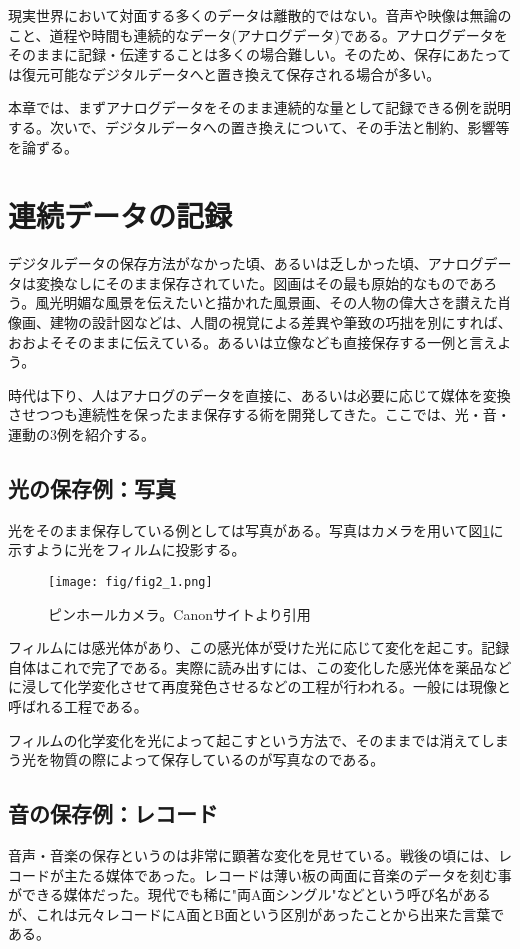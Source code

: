 現実世界において対面する多くのデータは離散的ではない。音声や映像は無論のこと、道程や時間も連続的なデータ(アナログデータ)である。アナログデータをそのままに記録・伝達することは多くの場合難しい。そのため、保存にあたっては復元可能なデジタルデータへと置き換えて保存される場合が多い。

本章では、まずアナログデータをそのまま連続的な量として記録できる例を説明する。次いで、デジタルデータへの置き換えについて、その手法と制約、影響等を論ずる。

\section{連続データの記録}

デジタルデータの保存方法がなかった頃、あるいは乏しかった頃、アナログデータは変換なしにそのまま保存されていた。図画はその最も原始的なものであろう。風光明媚な風景を伝えたいと描かれた風景画、その人物の偉大さを讃えた肖像画、建物の設計図などは、人間の視覚による差異や筆致の巧拙を別にすれば、おおよそそのままに伝えている。あるいは立像なども直接保存する一例と言えよう。

時代は下り、人はアナログのデータを直接に、あるいは必要に応じて媒体を変換させつつも連続性を保ったまま保存する術を開発してきた。ここでは、光・音・運動の3例を紹介する。

\subsection{光の保存例：写真}
光をそのまま保存している例としては写真がある。写真はカメラを用いて図\ref{fig2_1}に示すように光をフィルムに投影する。
\begin{figure}[htbp]
\centering
\texttt{[image: fig/fig2\_1.png]}
\caption{ピンホールカメラ。Canonサイトより引用}\label{fig2_1}
\end{figure}

フィルムには感光体があり、この感光体が受けた光に応じて変化を起こす。記録自体はこれで完了である。実際に読み出すには、この変化した感光体を薬品などに浸して化学変化させて再度発色させるなどの工程が行われる。一般には現像と呼ばれる工程である。

フィルムの化学変化を光によって起こすという方法で、そのままでは消えてしまう光を物質の際によって保存しているのが写真なのである。

\subsection{音の保存例：レコード}
音声・音楽の保存というのは非常に顕著な変化を見せている。戦後の頃には、レコードが主たる媒体であった。レコードは薄い板の両面に音楽のデータを刻む事ができる媒体だった。現代でも稀に"両A面シングル"などという呼び名があるが、これは元々レコードにA面とB面という区別があったことから出来た言葉である。

